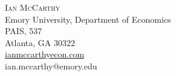 \documentclass[9pt]{article}
\newenvironment{changemargin}[2]{%
  \begin{list}{}{%
    \setlength{\topsep}{0pt}%
    \setlength{\leftmargin}{#1}%
    \setlength{\rightmargin}{#2}%
    \setlength{\listparindent}{\parindent}%
    \setlength{\itemindent}{\parindent}%
    \setlength{\parsep}{\parskip}%
  }%
  \item[]}{\end{list}
}
\newcommand{\contact}[6]{
	\begin{changemargin}{-0.5in}{-0.5in}
		\begin{center}
			{\Large \scshape {#1}}\\ \vspace{0.01in}
			{#2}\\ \vspace{0.01in}
			{#3}\\ \vspace{0.01in}
			{#4}\\ \vspace{0.01in}
            {#5}\\ \vspace{0.01in}
            {#6}\\ \vspace{0.01in}
		\end{center}
	\end{changemargin}
}
\begin{document}
\thispagestyle{firststyle}

\contact{Ian McCarthy}{Emory University, Department of Economics}{PAIS, 537}{Atlanta, GA 30322}{\href{www.ianmccarthyecon.com}{ianmccarthyecon.com}}{ian.mccarthy@emory.edu}

\end{document}
